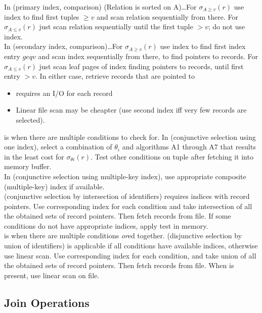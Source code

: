 \documentclass{article}
\begin{document}
In  (primary index, comparison) (Relation is sorted on A)\dots For $\sigma_{A \geq v}(r)$ use index to find first tuples $\geq v$ and scan relation sequentially from there. For $\sigma_{A \leq v}(r)$ just scan relation sequentially until the first tuple $> v$; do not use index. \\ 

In  (secondary index, comparison)\dots For $\sigma_{A \geq v}(r)$ use index to find first index entry $geq v$ and scan index sequentially from there, to find pointers to records. For $\sigma_{A \leq  v}(r)$ just scan leaf pages of index finding pointers to records, until first entry $> v$. In either case, retrieve records that are pointed to 
\begin{itemize}
  \item requires an I/O for each record 
  \item Linear file scan may be cheapter (use second index iff very few records are selected). 
\end{itemize}

 is when there are multiple conditions to check for. In  (conjunctive selection using one index), select a combination of $\theta_i$ and algorithms A1 through A7 that results in the least cost for $\sigma_{\theta i}(r)$. Test other conditions on tuple after fetching it into memory buffer. \\

In  (conjunctive selection using multiple-key index), use appropriate composite (multiple-key) index if available. \\ 

 (conjunctive selection by intersection of identifiers) requires indices with record pointers. Use corresponding index for each condition and take intersection of all the obtained sets of record pointers. Then fetch records from file. If some conditions do not have appropriate indices, apply test in memory. \\ 

 is when there are multiple conditions \emph{or}ed together.  (disjunctive selection by union of identifiers) is applicable if all conditions have available indices, otherwise use linear scan. Use corresponding index for each condition, and take union of all the obtained sets of record pointers. Then fetch records from file. When  is present, use linear scan on file. 

\subsection{Join Operations}
\end{document}
